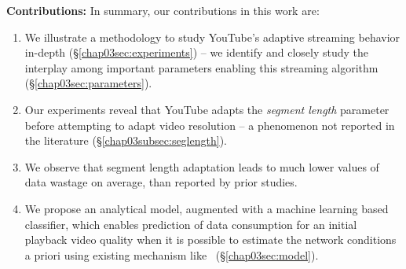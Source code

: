{\bf Contributions:} In summary, our contributions in this work are:
\begin{enumerate}
 \item We illustrate a methodology to study YouTube's adaptive streaming behavior in-depth (\S\ref{chap03sec:experiments}) -- we identify and closely study the interplay among important parameters enabling this streaming algorithm (\S\ref{chap03sec:parameters}).
 \item Our experiments reveal that YouTube adapts the {\it segment length} parameter before attempting to adapt video resolution -- a phenomenon not reported in the literature (\S\ref{chap03subsec:seglength}).
 \item We observe that segment length adaptation leads to much lower values of data wastage on average, than reported by prior studies.
 \item We propose an analytical model, augmented with a machine learning based classifier, which enables prediction of data consumption for an initial playback video quality when it is possible to estimate the network conditions a priori using existing mechanism like~\cite{zou2015can}  (\S\ref{chap03sec:model}).
\end{enumerate}

